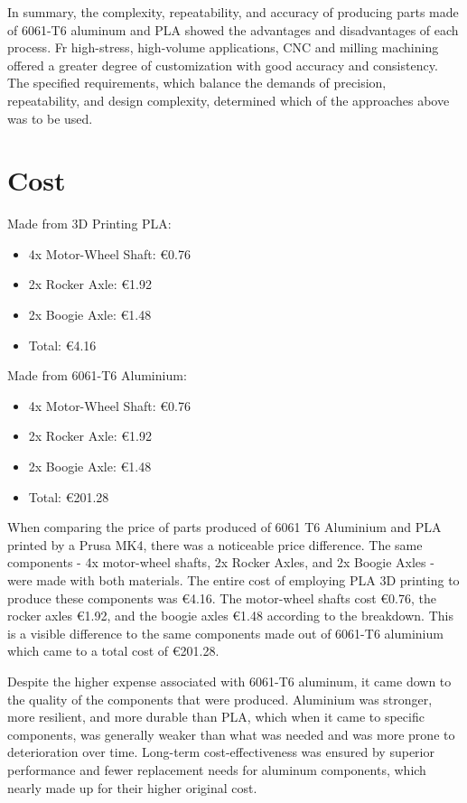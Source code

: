     In summary, the complexity, repeatability, and accuracy of producing parts made of 6061-T6 aluminum
    and PLA showed the advantages and disadvantages of each process. Fr high-stress, high-volume
    applications, CNC and milling machining offered a greater degree of customization with good accuracy
    and consistency. The specified requirements, which balance the demands of precision, repeatability, and
    design complexity, determined which of the approaches above was to be used.

\section{Cost}

    Made from 3D Printing PLA:
    \begin{itemize}
        \item 4x Motor-Wheel Shaft: €0.76
        \item 2x Rocker Axle: €1.92
        \item 2x Boogie Axle: €1.48
        \item Total: €4.16
    \end{itemize}

    Made from 6061-T6 Aluminium:

    \begin{itemize}
        \item 4x Motor-Wheel Shaft: €0.76
        \item 2x Rocker Axle: €1.92
        \item 2x Boogie Axle: €1.48
        \item Total: €201.28
    \end{itemize}

    When comparing the price of parts produced of 6061 T6 Aluminium and PLA printed by a Prusa MK4, there
    was a noticeable price difference. The same components - 4x motor-wheel shafts, 2x Rocker Axles, and 2x Boogie Axles - were made with both materials. The entire cost of employing PLA 3D printing to produce
    these components was €4.16. The motor-wheel shafts cost €0.76, the rocker axles €1.92, and the boogie
    axles €1.48 according to the breakdown. This is a visible difference to the same components made out of
    6061-T6 aluminium which came to a total cost of €201.28.

    Despite the higher expense associated with 6061-T6 aluminum, it came down to the quality of the components that were produced. Aluminium was stronger, more resilient, and more durable than PLA,
    which when it came to specific components, was generally weaker than what was needed and was more
    prone to deterioration over time. Long-term cost-effectiveness was ensured by superior performance
    and fewer replacement needs for aluminum components, which nearly made up for their higher original
    cost.

